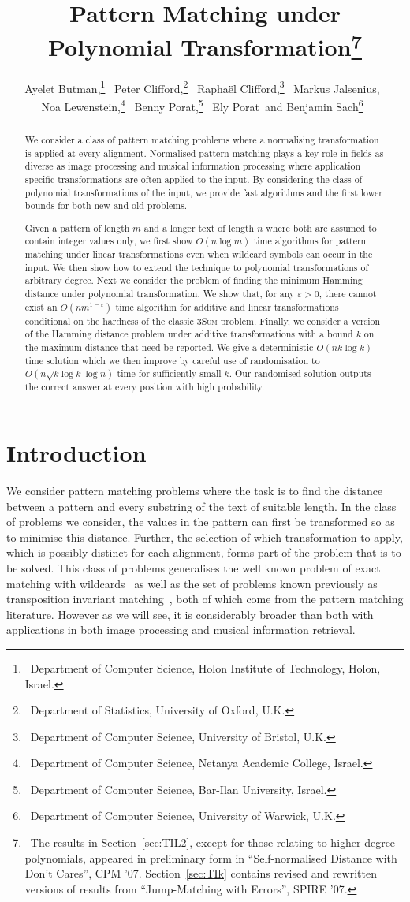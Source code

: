 \documentclass[11pt]{article}
\title{Pattern Matching under Polynomial Transformation\thanks{~The results in Section~\ref{sec:TIL2}, except for those relating to higher degree polynomials, appeared in preliminary form in ``Self-normalised Distance with Don't Cares'', CPM '07.   Section~\ref{sec:TIk} contains revised and rewritten versions of results from ``Jump-Matching with Errors'', SPIRE '07.}}
\author{\ Ayelet Butman,\thanks{~Department of Computer Science, Holon Institute of Technology, Holon, Israel.}
\ Peter Clifford,\thanks{~Department of Statistics, University of Oxford, U.K.}
\ Rapha\"el Clifford,\thanks{~Department of Computer Science, University of Bristol, U.K.}
\ Markus Jalsenius,\footnotemark[4]~~
\\Noa Lewenstein,\thanks{~Department of Computer Science, Netanya Academic College, Israel.}
\ Benny Porat,\thanks{~Department of Computer Science, Bar-Ilan University, Israel.}
\ Ely Porat\footnotemark[6]
\ and Benjamin Sach\thanks{~Department of Computer Science, University of Warwick, U.K.}~
}
\date{}
\renewcommand{\epsilon}{\varepsilon}
\newcommand{\threeSUM}{\textsc{3Sum}\xspace}
\theoremstyle{plain}
\theoremstyle{definition}
\begin{document}
\maketitle

\begin{abstract}
    We consider a class of pattern matching problems where a normalising transformation is applied at every alignment. Normalised pattern matching plays a key role in fields as diverse as image processing and musical information processing where application specific transformations are often applied to the input.  By considering the class of polynomial transformations of the input, we provide  fast algorithms and the first lower bounds for both new and old problems.

    Given a pattern of length $m$ and a longer text of length $n$ where both are assumed to contain integer values only, we first show $O(n\log{m})$ time algorithms for pattern matching under linear transformations even when wildcard symbols can occur in the input.  We then show how to extend the technique to polynomial transformations of arbitrary degree.  Next we consider the problem of finding the minimum Hamming distance under polynomial transformation. We show that, for any $\epsilon>0$, there cannot exist an $O(nm^{1-\epsilon})$ time algorithm for additive and linear transformations conditional on the hardness of the classic \threeSUM problem. Finally, we consider a version of the Hamming distance problem under additive transformations with a bound $k$ on the maximum distance that need be reported.  We give a deterministic $O(nk \log k)$ time solution which we then improve by careful use of randomisation to $O(n\sqrt{k\log k}\log n)$ time for sufficiently small $k$. Our randomised solution outputs the correct answer at every position with high probability.
\end{abstract}







\section{Introduction}

We consider pattern matching problems where the task is to find the distance between a pattern and every substring of the text of suitable length.  In the class of problems we consider, the values in the pattern can first be transformed so as to minimise this distance. Further, the selection of which transformation to apply, which is possibly distinct for each alignment, forms part of the problem that is to be solved. This class of problems generalises the well known problem of exact matching with wildcards~\cite{CH:2002, Clifford:2007} as well as the set of problems known previously as transposition invariant matching~\cite{MNU:2005}, both of which come from the pattern matching literature. However as we will see, it is considerably broader than both with applications in both image processing and musical information retrieval.
\end{document}
